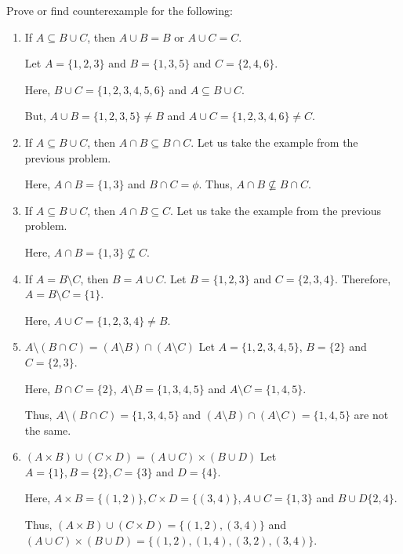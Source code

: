 \bp 
	Prove or find counterexample for the following:
	\begin{enumerate}
		\item If $A \subseteq B \cup C$, then $A \cup B = B$ or $A \cup C = C$.
		
			\bs
				Let $A = \{1, 2, 3\}$ and $B = \{ 1, 3, 5 \}$ and $C = \{ 2, 4, 6 \}$.

				Here, $B \cup C = \{1, 2, 3, 4, 5, 6\}$ and $A \subseteq B \cup C$.

				But, $A \cup B = \{1, 2, 3, 5\} \neq B$ and $A \cup C = \{1, 2, 3, 4, 6\} \neq C$.
			\es
		
		\item If $A \subseteq B \cup C$, then $A \cap B \subseteq B \cap C$.
			\bs
				Let us take the example from the previous problem. 

				Here, $A \cap B = \{1, 3\}$ and $B \cap C = \phi$. Thus, $A \cap B \not\subseteq B \cap C$.
			\es

		\item If $A \subseteq B \cup C$, then $A \cap B \subseteq C$.
			\bs
				Let us take the example from the previous problem. 

				Here, $A \cap B = \{1, 3\} \not\subseteq C$.
			\es


		\item If $A = B \setminus C$, then $B = A \cup C$.
			\bs
				Let $B = \{1, 2, 3\}$ and $C = \{2, 3, 4\}$. Therefore, $A = B \setminus C = \{1\}$.

				Here, $A \cup C = \{1, 2, 3, 4\} \neq B$.
			\es


		\item $A \setminus (B \cap C) = (A \setminus B) \cap (A \setminus C)$
			\bs
				Let $A = \{1, 2, 3, 4, 5\}$, $B = \{2\}$ and $C = \{2, 3\}$.

				Here, $B \cap C = \{2\}$, $A \setminus B = \{1, 3, 4, 5\}$ and $A \setminus C = \{ 1, 4, 5 \}$.

				Thus, $A \setminus (B \cap C) = \{1, 3, 4, 5\}$ and $(A \setminus B) \cap (A \setminus C) = \{1, 4, 5\}$ are not the same.
			\es
			
		\item $(A \times B) \cup (C \times D) = (A \cup C) \times (B \cup D)$
			\bs
				Let $A = \{1\}, B = \{2\}, C = \{3\}$ and $D = \{4\}$.

				Here, $A \times B = \{(1, 2)\}, C \times D = \{(3,4)\}, 
				A \cup C = \{1, 3\}$ and $B \cup D \{2, 4\}$.

				Thus, $(A \times B) \cup (C \times D) = \{(1, 2), (3, 4)\}$ and 
				$(A \cup C) \times (B \cup D) = \{(1, 2),(1, 4), (3, 2), (3, 4)\}$.


\end{enumerate}
